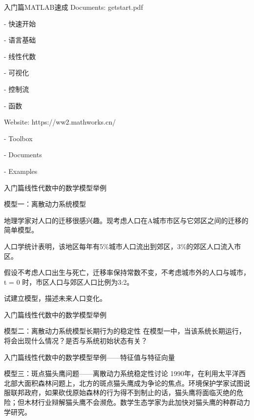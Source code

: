 \documentclass{beamer}
\begin{document}
\begin{frame}{入门篇}{MATLAB速成}
Documents: getstart.pdf

- 快速开始

- 语言基础

- 线性代数

- 可视化

- 控制流

- 函数

Website: https://ww2.mathworks.cn/

- Toolbox

- Documents

- Examples
\end{frame}



\begin{frame}{入门篇}{线性代数中的数学模型举例}
\begin{block}{模型一：离散动力系统模型}

地理学家对人口的迁移很感兴趣。现考虑人口在A城市市区与它郊区之间的迁移的简单模型。

人口学统计表明，该地区每年有5\%城市人口流出到郊区，3\%的郊区人口流入市区。

假设不考虑人口出生与死亡，迁移率保持常数不变，不考虑城市外的人口与城市，t = 0 时，市区人口与郊区人口比例为3:2。

试建立模型，描述未来人口变化。
\end{block}
\end{frame}

\begin{frame}{入门篇}{线性代数中的数学模型举例}
\begin{block}{模型二：离散动力系统模型长期行为的稳定性}
在模型一中，当该系统长期运行，将会出现什么情况？是否与系统初始状态有关？
\end{block}
\end{frame}

\begin{frame}{入门篇}{线性代数中的数学模型举例——特征值与特征向量}
\begin{block}{模型三：斑点猫头鹰问题——离散动力系统稳定性讨论}
1990年，在利用太平洋西北部大面积森林问题上，北方的斑点猫头鹰成为争论的焦点。环境保护学家试图说服联邦政府，如果砍伐原始森林的行为得不到制止的话，猫头鹰将面临灭绝的危险；但木材行业辩解猫头鹰不会濒危。数学生态学家为此加快对猫头鹰的种群动力学研究。
\end{block}
\end{frame}
\end{document}
